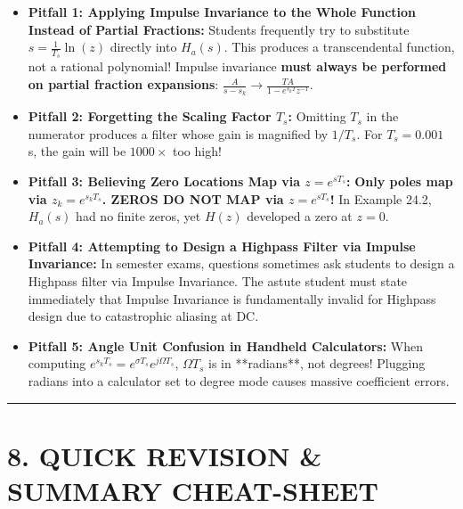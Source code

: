 \documentclass[11pt,a4paper]{article}
\begin{document}
\begin{itemize}
    \item \textbf{Pitfall 1: Applying Impulse Invariance to the Whole Function Instead of Partial Fractions:}
    Students frequently try to substitute $s = \frac{1}{T_s}\ln(z)$ directly into $H_a(s)$. This produces a transcendental function, not a rational polynomial! Impulse invariance \textbf{must always be performed on partial fraction expansions}: $\frac{A}{s - s_k} \to \frac{T A}{1 - e^{s_k T} z^{-1}}$.
    
    \item \textbf{Pitfall 2: Forgetting the Scaling Factor $T_s$:}
    Omitting $T_s$ in the numerator produces a filter whose gain is magnified by $1/T_s$. For $T_s = 0.001$ s, the gain will be $1000\times$ too high!
    
    \item \textbf{Pitfall 3: Believing Zero Locations Map via $z = e^{s T_s}$:}
    \textbf{Only poles map via $z_k = e^{s_k T_s}$. ZEROS DO NOT MAP via $z = e^{s T_s}$!} In Example 24.2, $H_a(s)$ had no finite zeros, yet $H(z)$ developed a zero at $z = 0$.
    
    \item \textbf{Pitfall 4: Attempting to Design a Highpass Filter via Impulse Invariance:}
    In semester exams, questions sometimes ask students to design a Highpass filter via Impulse Invariance. The astute student must state immediately that Impulse Invariance is fundamentally invalid for Highpass design due to catastrophic aliasing at DC.
    
    \item \textbf{Pitfall 5: Angle Unit Confusion in Handheld Calculators:}
    When computing $e^{s_k T_s} = e^{\sigma T_s} e^{j \Omega T_s}$, $\Omega T_s$ is in **radians**, not degrees! Plugging radians into a calculator set to degree mode causes massive coefficient errors.
\end{itemize}

\noindent\rule{\textwidth}{0.5pt}

\section{8. QUICK REVISION \& SUMMARY CHEAT-SHEET}
\end{document}
